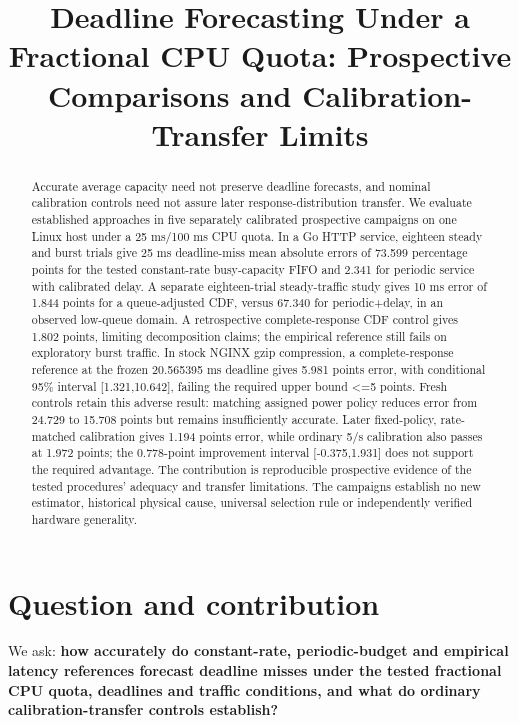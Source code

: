\documentclass[11pt,a4paper]{article}
\title{Deadline Forecasting Under a Fractional CPU Quota: Prospective Comparisons and Calibration-Transfer Limits}
\author{}
\date{}
\begin{document}
\maketitle
\begin{abstract}

Accurate average capacity need not preserve deadline forecasts, and nominal
calibration controls need not assure later response-distribution transfer.
We evaluate established approaches in five separately calibrated prospective
campaigns on one Linux host under a 25 ms/100 ms CPU quota. In a Go HTTP
service, eighteen steady and burst trials give 25 ms deadline-miss mean absolute
errors of 73.599 percentage points for the tested constant-rate busy-capacity
FIFO and 2.341 for periodic service with calibrated delay. A separate eighteen-trial
steady-traffic study gives 10 ms error of 1.844 points for a queue-adjusted CDF,
versus 67.340 for periodic+delay, in an observed low-queue domain. A retrospective
complete-response CDF control gives 1.802 points, limiting decomposition claims;
the empirical reference still fails on exploratory burst traffic. In stock
NGINX gzip compression, a complete-response reference at the frozen 20.565395 ms
deadline gives 5.981 points error, with conditional 95\% interval [1.321,10.642],
failing the required upper bound <=5 points. Fresh controls retain this adverse
result: matching assigned power policy reduces error from 24.729 to 15.708
points but remains insufficiently accurate. Later fixed-policy, rate-matched
calibration gives 1.194 points error, while ordinary 5/s calibration also passes
at 1.972 points; the 0.778-point improvement interval [-0.375,1.931] does not
support the required advantage. The contribution is reproducible prospective
evidence of the tested procedures' adequacy and transfer limitations. The
campaigns establish no new estimator, historical physical cause, universal
selection rule or independently verified hardware generality.

\end{abstract}
\section{Question and contribution}

We ask: \textbf{how accurately do constant-rate, periodic-budget and empirical latency references forecast deadline misses under the tested fractional CPU quota, deadlines and traffic conditions, and what do ordinary calibration-transfer controls establish?}
\end{document}
